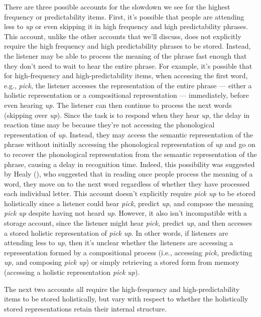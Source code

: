 \documentclass[
  12pt,
  letterpaper,
]{scrreprt}
\begin{document}
There are three possible accounts for the slowdown we see for the
highest frequency or predictability items. First, it's possible that
people are attending less to \emph{up} or even skipping it in high
frequency and high predictability phrases. This account, unlike the
other accounts that we'll discuss, does not explicitly require the high
frequency and high predictability phrases to be stored. Instead, the
listener may be able to process the meaning of the phrase fast enough
that they don't need to wait to hear the entire phrase. For example,
it's possible that for high-frequency and high-predictability items,
when accessing the first word, e.g., \emph{pick}, the listener accesses
the representation of the entire phrase --- either a holistic
representation or a compositional representation --- immediately, before
even hearing \emph{up}. The listener can then continue to process the
next words (skipping over \emph{up}). Since the task is to respond when
they hear \emph{up}, the delay in reaction time may be because they're
not accessing the phonological representation of \emph{up}. Instead,
they may access the semantic representation of the phrase without
initially accessing the phonological representation of \emph{up} and go
on to recover the phonological representation from the semantic
representation of the phrase, causing a delay in recognition time.
Indeed, this possibility was suggested by Healy
(), who suggested that
in reading once people process the meaning of a word, they move on to
the next word regardless of whether they have processed each individual
letter. This account doesn't explicitly require \emph{pick up} to be
stored holistically since a listener could hear \emph{pick}, predict
\emph{up}, and compose the meaning \emph{pick up} despite having not
heard \emph{up}. However, it also isn't incompatible with a storage
account, since the listener might hear \emph{pick,} predict \emph{up},
and then accesses a stored holistic representation of \emph{pick up}. In
other words, if listeners are attending less to \emph{up}, then it's
unclear whether the listeners are accessing a representation formed by a
compositional process (i.e., accessing \emph{pick,} predicting
\emph{up,} and composing \emph{pick up}) or simply retrieving a stored
form from memory (accessing a holistic representation \emph{pick up}).

The next two accounts all require the high-frequency and
high-predictability items to be stored holistically, but vary with
respect to whether the holistically stored representations retain their
internal structure.
\end{document}
